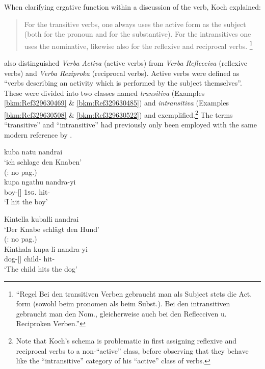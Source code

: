 When clarifying ergative function within a discussion of the verb, Koch explained:

\begin{quote}
For the transitive verbs, one always uses the active form as the subject (both for the pronoun and for the substantive). For the intransitives one uses the nominative, likewise also for the reflexive and reciprocal verbs. \citep[no pag.]{koch_untitled_1868}\footnote{``Regel Bei den transitiven Verben gebraucht man als Subject stets die Act. form (sowohl beim pronomen als beim Subst.). Bei den intransitiven gebraucht man den Nom., gleicherweise auch bei den Reflecciven u. Reciproken Verben.''}
\end{quote}

\citet[no pag.]{koch_untitled_1868} also distinguished \textit{Verba Activa} (active verbs) from \textit{Verba Reflecciva} (reflexive verbs) and \textit{Verba Reziproka} (reciprocal verbs). Active verbs were defined as “verbs describing an activity which is performed by the subject themselves”. These were divided into two classes named \textit{transitiva} (Examples \ref{bkm:Ref329630469} \& \ref{bkm:Ref329630485}) and \textit{intransitiva} (Examples \ref{bkm:Ref329630508} \& \ref{bkm:Ref329630522}) and exemplified.\footnote{Note that Koch’s schema is problematic in first assigning reflexive and reciprocal verbs to a non-“active” class, before observing that they behave like the “intransitive” category of his “active” class of verbs.} The terms “transitive” and “intransitive” had previously only been employed with the same modern reference by \citet[20]{moorhouse_vocabulary_1846}.

\ea\label{bkm:Ref329630469}
	kuba natu nandrai \\
	\glt `ich schlage den Knaben'\\
	(\citealt{koch_untitled_1868}: no pag.) \\
	\gll kupa              ngathu     nandra-yi\\
	boy-[]  1\textsc{sg}.   hit-\\
	\glt `I hit the boy'
\z

\ea\label{bkm:Ref329630485}
	Kintella kuballi nandrai \\
	\glt `Der Knabe schlägt den Hund' \\
	(\citealt{koch_untitled_1868}: no pag.) \\
	\gll Kinthala       kupa-li    nandra-yi\\
	dog-[]   child-    hit-\\
	\glt `The child hits the dog'
\z

